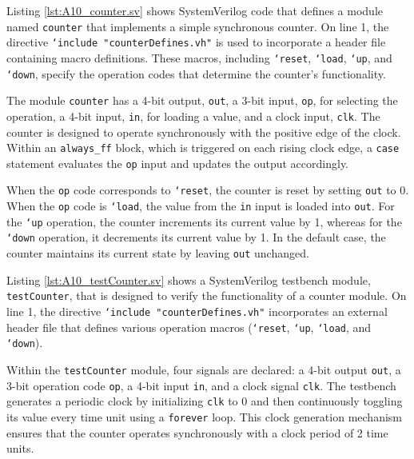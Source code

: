 Listing \ref{lst:A10_counter.sv} shows SystemVerilog code that defines a module named \texttt{counter} that implements a simple synchronous counter. On line 1, the directive \texttt{`include "counterDefines.vh"} is used to incorporate a header file containing macro definitions. These macros, including \texttt{`reset}, \texttt{`load}, \texttt{`up}, and \texttt{`down}, specify the operation codes that determine the counter’s functionality.

The module \texttt{counter} has a 4-bit output, \texttt{out}, a 3-bit input, \texttt{op}, for selecting the operation, a 4-bit input, \texttt{in}, for loading a value, and a clock input, \texttt{clk}. The counter is designed to operate synchronously with the positive edge of the clock. Within an \texttt{always\_ff} block, which is triggered on each rising clock edge, a \texttt{case} statement evaluates the \texttt{op} input and updates the output accordingly.

When the \texttt{op} code corresponds to \texttt{`reset}, the counter is reset by setting \texttt{out} to 0. When the \texttt{op} code is \texttt{`load}, the value from the \texttt{in} input is loaded into \texttt{out}. For the \texttt{`up} operation, the counter increments its current value by 1, whereas for the \texttt{`down} operation, it decrements its current value by 1. In the default case, the counter maintains its current state by leaving \texttt{out} unchanged.




Listing \ref{lst:A10_testCounter.sv} shows a SystemVerilog testbench module, \texttt{testCounter}, that is designed to verify the functionality of a counter module. On line 1, the directive \texttt{`include "counterDefines.vh"} incorporates an external header file that defines various operation macros (\texttt{`reset}, \texttt{`up}, \texttt{`load}, and \texttt{`down}).

Within the \texttt{testCounter} module, four signals are declared: a 4-bit output \texttt{out}, a 3-bit operation code \texttt{op}, a 4-bit input \texttt{in}, and a clock signal \texttt{clk}. The testbench generates a periodic clock by initializing \texttt{clk} to 0 and then continuously toggling its value every time unit using a \texttt{forever} loop. This clock generation mechanism ensures that the counter operates synchronously with a clock period of 2 time units.

